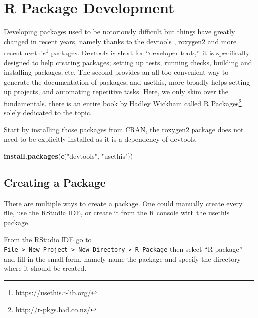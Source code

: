 \documentclass[
]{krantz}
\makeatletter
\newenvironment{Shaded}{\begin{snugshade}}{\end{snugshade}}
\newcommand{\KeywordTok}[1]{\textcolor[rgb]{0.27,0.27,0.27}{\textbf{#1}}}
\newcommand{\NormalTok}[1]{#1}
\newcommand{\StringTok}[1]{\textcolor[rgb]{0.5,0.5,0.5}{#1}}
\renewcommand{\href}[2]{#2\footnote{\url{#1}}}
\newenvironment{kframe}{%
\medskip{}
\setlength{\fboxsep}{.8em}
 \def\at@end@of@kframe{}%
 \ifinner\ifhmode%
  \def\at@end@of@kframe{\end{minipage}}%
  \begin{minipage}{\columnwidth}%
 \fi\fi%
 \def\FrameCommand##1{\hskip\@totalleftmargin \hskip-\fboxsep
 \colorbox{shadecolor}{##1}\hskip-\fboxsep
     \hskip-\linewidth \hskip-\@totalleftmargin \hskip\columnwidth}%
 \MakeFramed {\advance\hsize-\width
   \@totalleftmargin\z@ \linewidth\hsize
   \@setminipage}}%
 {\par\unskip\endMakeFramed%
 \at@end@of@kframe}
\renewenvironment{Shaded}{\begin{kframe}}{\end{kframe}}
\makeatother
\begin{document}
\hypertarget{basics-pacakge-dev}{%
\section{R Package Development}\label{basics-pacakge-dev}}

Developing packages used to be notoriously difficult but things have greatly changed in recent years, namely thanks to the devtools \citep{R-devtools}, roxygen2 \citep{R-roxygen2} and more recent \href{https://usethis.r-lib.org/}{usethis} \citep{R-usethis} packages. Devtools is short for ``developer tools,'' it is specifically designed to help creating packages; setting up tests, running checks, building and installing packages, etc. The second provides an all too convenient way to generate the documentation of packages, and usethis, more broadly helps setting up projects, and automating repetitive tasks. Here, we only skim over the fundamentals, there is an entire book by Hadley Wickham called \href{http://r-pkgs.had.co.nz/}{R Packages} solely dedicated to the topic.

Start by installing those packages from CRAN, the roxygen2 package does not need to be explicitly installed as it is a dependency of devtools.

\begin{Shaded}
\begin{Highlighting}[]
\KeywordTok{install.packages}\NormalTok{(}\KeywordTok{c}\NormalTok{(}\StringTok{"devtools"}\NormalTok{, }\StringTok{"usethis"}\NormalTok{))}
\end{Highlighting}
\end{Shaded}

\hypertarget{basics-create-pkg}{%
\subsection{Creating a Package}\label{basics-create-pkg}}

There are multiple ways to create a package. One could manually create every file, use the RStudio IDE, or create it from the R console with the usethis \citep{R-usethis} package.

From the RStudio IDE go to \texttt{File\ \textgreater{}\ New\ Project\ \textgreater{}\ New\ Directory\ \textgreater{}\ R\ Package} then select ``R package'' and fill in the small form, namely name the package and specify the directory where it should be created.
\end{document}
